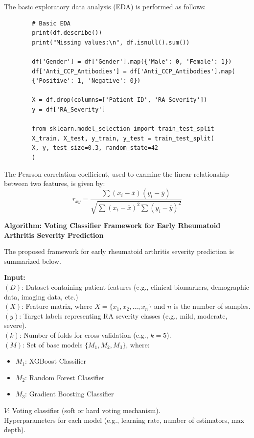 \documentclass[10pt]{NSP1}
\begin{document}
	The basic exploratory data analysis (EDA) is performed as follows:
	\begin{verbatim}
		# Basic EDA
		print(df.describe())
		print("Missing values:\n", df.isnull().sum())
		
		df['Gender'] = df['Gender'].map({'Male': 0, 'Female': 1})
		df['Anti_CCP_Antibodies'] = df['Anti_CCP_Antibodies'].map(
		{'Positive': 1, 'Negative': 0})
		
		X = df.drop(columns=['Patient_ID', 'RA_Severity'])
		y = df['RA_Severity']
		
		from sklearn.model_selection import train_test_split
		X_train, X_test, y_train, y_test = train_test_split(
		X, y, test_size=0.3, random_state=42
		)
	\end{verbatim}
	
	The Pearson correlation coefficient, used to examine the linear relationship between two features, is given by:
	\begin{equation}
		r_{xy} =
		\frac{
			\sum (x_i - \bar{x})(y_i - \bar{y})
		}{
			\sqrt{
				\sum (x_i - \bar{x})^2
				\sum (y_i - \bar{y})^2
			}
		}
	\end{equation}
	
	\noindent\textbf{Algorithm: Voting Classifier Framework for Early Rheumatoid Arthritis Severity Prediction}
	
	\noindent The proposed framework for early rheumatoid arthritis severity prediction is summarized below.
	
	\noindent\textbf{Input:}\\
	\noindent$(D)$: Dataset containing patient features (e.g., clinical biomarkers, demographic data, imaging data, etc.)\\
	\noindent$(X)$: Feature matrix, where $X=\{x_1, x_2, \dots, x_n\}$ and $n$ is the number of samples.\\
	\noindent$(y)$: Target labels representing RA severity classes (e.g., mild, moderate, severe).\\
	\noindent$(k)$: Number of folds for cross-validation (e.g., $k = 5$).\\
	\noindent$(M)$: Set of base models $\{M_1, M_2, M_3\}$, where:
	\begin{itemize}
		\item $M_1$: XGBoost Classifier
		\item $M_2$: Random Forest Classifier
		\item $M_3$: Gradient Boosting Classifier
	\end{itemize}
	\noindent$V$: Voting classifier (soft or hard voting mechanism).\\
	\noindent Hyperparameters for each model (e.g., learning rate, number of estimators, max depth).
	
\end{document}
